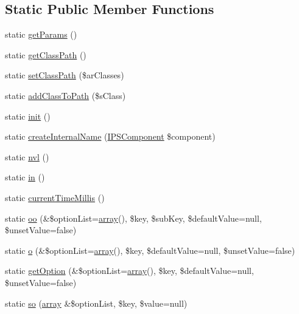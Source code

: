 \subsection*{Static Public Member Functions}
\begin{DoxyCompactItemize}
\item 
static \hyperlink{classCPSHelperBase_a8ac5625213c62cbfacb0cc46b085f10c}{getParams} ()
\item 
static \hyperlink{classCPSHelperBase_ab65207cbc621cd3db1d453c7256df47f}{getClassPath} ()
\item 
static \hyperlink{classCPSHelperBase_a447979fd6deb6b6d84dc5efdc6b110f7}{setClassPath} (\$arClasses)
\item 
static \hyperlink{classCPSHelperBase_a16290a4f6b9920eb65ab0052df0d6bc9}{addClassToPath} (\$sClass)
\item 
static \hyperlink{classCPSHelperBase_a9f0be6ae273d3669e11c29910a0be338}{init} ()
\item 
static \hyperlink{classCPSHelperBase_a5199d81ae6877c4a94b92bbbc9899254}{createInternalName} (\hyperlink{interfaceIPSComponent}{IPSComponent} \$component)
\item 
static \hyperlink{classCPSHelperBase_a666bf0c7e9a3320e2e1ca2d9b65301e6}{nvl} ()
\item 
static \hyperlink{classCPSHelperBase_a41826678a323714d7b160530202af138}{in} ()
\item 
static \hyperlink{classCPSHelperBase_acd68f45a82d2033e048ef609d455290c}{currentTimeMillis} ()
\item 
static \hyperlink{classCPSHelperBase_a70efdcf232533bf1c9203417a0a489c7}{oo} (\&\$optionList=\hyperlink{list_8php_aa3205d038c7f8feb5c9f01ac4dfadc88}{array}(), \$key, \$subKey, \$defaultValue=null, \$unsetValue=false)
\item 
static \hyperlink{classCPSHelperBase_a557243d020090bff2b3cb6cdb03d31aa}{o} (\&\$optionList=\hyperlink{list_8php_aa3205d038c7f8feb5c9f01ac4dfadc88}{array}(), \$key, \$defaultValue=null, \$unsetValue=false)
\item 
static \hyperlink{classCPSHelperBase_a53defc41ed9a31f73c09a9f18eb17ffc}{getOption} (\&\$optionList=\hyperlink{list_8php_aa3205d038c7f8feb5c9f01ac4dfadc88}{array}(), \$key, \$defaultValue=null, \$unsetValue=false)
\item 
static \hyperlink{classCPSHelperBase_a68ffb34193bb1fc4e9ba07af567b1641}{so} (\hyperlink{list_8php_aa3205d038c7f8feb5c9f01ac4dfadc88}{array} \&\$optionList, \$key, \$value=null)
\item 

\end{DoxyCompactItemize}
